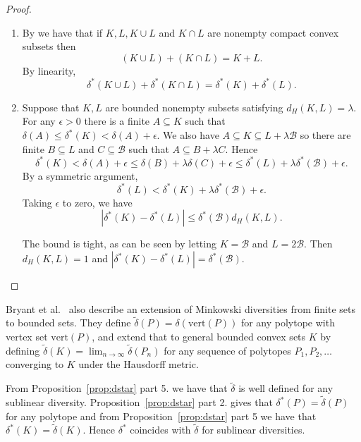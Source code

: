 \documentclass[11pt]{article}
\renewcommand{\Re}{\mathbb{R}}
\newcommand{\sB}{\mathcal{B}}
\newcommand{\tdelta}{\widetilde{\delta}}
\begin{document}
\begin{proof}
\begin{enumerate}
Suppose that $(\Re^k,\delta)$ is linear. Given $\epsilon>0$ there are finite $A \subseteq K$ and $B \subseteq L$ such  that 
\[\delta^*(K) < \delta(A) + \epsilon/2 \mbox{ and } \delta^*(L) < \delta(B) + \epsilon/2.\]
We then have 
\[\delta^*(K) + \delta^*(L) < \delta(A) + \delta(B) + \epsilon = \delta(A+B) + \epsilon \leq \delta^*(K+L) + \epsilon\]
as $A+B \subseteq K+L$. Taking $\epsilon \rightarrow 0$ and applying sublinearity gives
\[\delta^*(K + L) = \delta^*(K) + \delta^*(L).\]
\item By \cite[Lem.~3.1.1]{Schneider14} we have that if $K,L,K\cup L$ and $K\cap L$ are nonempty compact convex subsets then 
\[(K \cup L) + (K \cap L) = K+L. \]
By linearity, 
\[\delta^*(K \cup L) + \delta^*(K \cap L) = \delta^*(K) + \delta^*(L).\]
\item Suppose that $K,L$ are bounded nonempty subsets satisfying $d_H(K,L) = \lambda$. For any $\epsilon>0$ there is a finite $A \subseteq K$  such that $\delta(A) \leq \delta^*(K) < \delta(A) + \epsilon$. We also have $A \subseteq K \subseteq L + \lambda \sB$ so there are finite $B \subseteq L$ and $C \subseteq \sB$ such that $A \subseteq B + \lambda C$. Hence
\[ \delta^*(K) < \delta(A) + \epsilon \leq  \delta(B) + \lambda \delta(C) + \epsilon \leq \delta^*(L) + \lambda \delta^*(\sB) + \epsilon.\]
By a symmetric argument, 
\[ \delta^*(L) < \delta^*(K) + \lambda \delta^*(\sB) + \epsilon.\]
Taking $\epsilon$ to zero, we have
\[ |\delta^*(K) - \delta^*(L) | \leq \delta^*(\sB) d_H(K,L).\]

The bound is tight, as can be seen by letting $K = \sB$ and $L = 2 \sB$. Then $d_H(K,L) = 1$ and $|\delta^*(K) - \delta^*(L) | = \delta^*(\sB)$. 
\end{enumerate}
\end{proof}

Bryant et al.~\cite{bryant2023diversities} also describe  an extension of Minkowski diversities from finite sets to bounded sets. They define $\tdelta(P) = \delta(\mathrm{vert}(P))$ for any polytope with vertex set $\mathrm{vert}(P)$, and extend that to general bounded convex sets $K$ by defining $\tdelta(K) = \lim_{n \rightarrow \infty} \tdelta(P_n)$ for any sequence of polytopes $P_1,P_2,\ldots$ converging to $K$ under the Hausdorff metric. 

From Proposition~\ref{prop:dstar} part 5. we have that $\tdelta$ is well defined for any sublinear diversity. Proposition~\ref{prop:dstar} part 2. gives that $\delta^*(P) = \tdelta(P)$ for any polytope and from Proposition~\ref{prop:dstar} part 5 we have that $\delta^*(K) = \tdelta(K)$. Hence $\delta^*$ coincides with $\tdelta$ for sublinear diversities.
\end{document}
